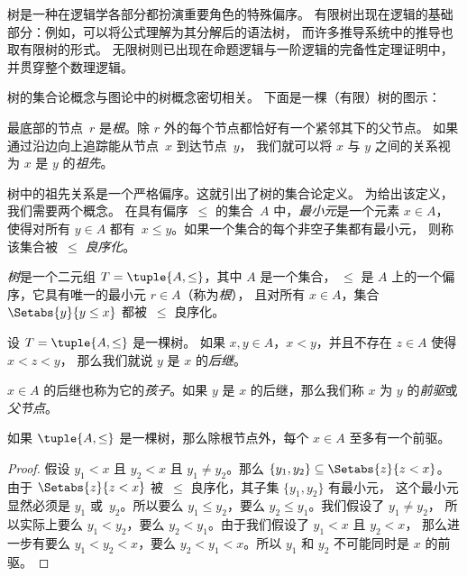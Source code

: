 \documentclass[../../../include/open-logic-section]{subfiles}
\begin{document}

树是一种在逻辑学各部分都扮演重要角色的特殊偏序。
有限树出现在逻辑的基础部分：例如，可以将公式理解为其分解后的语法树，
而许多推导系统中的推导也取有限树的形式。
%
无限树则已出现在命题逻辑与一阶逻辑的完备性定理证明中，
并贯穿整个数理逻辑。

树的集合论概念与图论中的树概念密切相关。
下面是一棵（有限）树的图示：

\begin{center}
\end{center}

最底部的节点~$r$ 是\emph{根}。除 $r$ 外的每个节点都恰好有一个紧邻其下的父节点。
如果通过沿边向上追踪能从节点~$x$ 到达节点~$y$，
我们就可以将 $x$ 与 $y$ 之间的关系视为 $x$ 是 $y$ 的\emph{祖先}。

树中的祖先关系是一个严格偏序。这就引出了树的集合论定义。
为给出该定义，我们需要两个概念。
在具有偏序~$\le$ 的集合~$A$ 中，\emph{最小元}是一个元素 $x \in A$，
使得对所有 $y \in A$ 都有~$x \le y$。如果一个集合的每个非空子集都有最小元，
则称该集合被~$\le$ \emph{良序化}。

\begin{defn}[树]
\emph{树}是一个二元组 $T = \tuple{A, \le}$，其中 $A$ 是一个集合，
$\le$ 是 $A$ 上的一个偏序，它具有唯一的最小元 $r \in A$（称为\emph{根}），
且对所有 $x \in A$，集合 $\Setabs{y}{y \le x}$ 都被~$\le$ 良序化。
\end{defn}

\begin{defn}[后继]
设 $T = \tuple{A, \le}$ 是一棵树。
如果 $x,y \in A$，$x < y$，并且不存在 $z \in A$ 使得 $x < z < y$，
那么我们就说 $y$ 是 $x$ 的\emph{后继}。
\end{defn}

$x \in A$ 的后继也称为它的\emph{孩子}。如果 $y$ 是 $x$ 的后继，那么我们称 $x$ 为 $y$ 的\emph{前驱}或\emph{父节点}。

\begin{prop}
如果 $\tuple{A,\le}$ 是一棵树，那么除根节点外，每个 $x \in A$ 至多有一个前驱。
\end{prop}

\begin{proof}
  假设 $y_1 < x$ 且 $y_2 < x$ 且 $y_1 \neq y_2$。那么 $\{y_1,
  y_2\} \subseteq \Setabs{z}{z<x}$。由于 $\Setabs{z}{z<x}$ 被~$\le$ 良序化，其子集 $\{y_1, y_2\}$ 有最小元，
  这个最小元显然必须是 $y_1$ 或~$y_2$。所以要么 $y_1 \le y_2$，要么 $y_2 \le y_1$。我们假设了 $y_1 \neq y_2$，
  所以实际上要么 $y_1 < y_2$，要么 $y_2 < y_1$。由于我们假设了 $y_1 < x$ 且 $y_2 < x$，
  那么进一步有要么 $y_1 < y_2 < x$，要么 $y_2 < y_1 < x$。所以 $y_1$ 和 $y_2$ 不可能同时是 $x$ 的前驱。
\end{proof}
\end{document}
